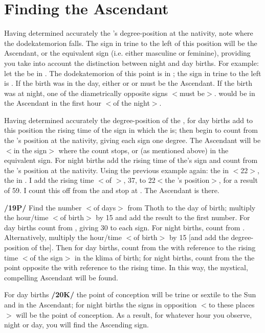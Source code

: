 \section{Finding the Ascendant}

Having determined accurately the \Sun’s degree-position at the nativity, note where the dodekatemorion falls. The sign in trine to the left of this position will be the Ascendant, or the equivalent sign (i.e. either masculine or feminine), providing you take into account the distinction between night and day births. For example: let the \Sun\xspace be in \Aquarius\xspace 22\deg. The dodekatemorion of this point is in \Scorpio; the sign in trine to the left is \Pisces. If the birth was in the day, either \Pisces\xspace or \Taurus\xspace or \Cancer\xspace must be the Ascendant. If the birth was at night, one of the diametrically opposite signs $<$must be$>$. \Virgo\xspace would be in the Ascendant in the first hour $<$of the night$>$.

Having determined accurately the degree-position of the \Sun, for day births add to this position the rising time of the sign in which the \Sun\xspace is; then begin to count from the \Moon’s position at the nativity, giving each sign one degree. The Ascendant will be $<$in the sign$>$ where the count stops, or (as mentioned above) in the equivalent sign. For night births add the rising time of the\Moon’s sign and count from the \Sun’s position at the nativity. Using the previous example again: the \Sun in \Aquarius\xspace $<$22\deg$>$, the \Moon\xspace in
\Scorpio. I add the rising time $<$of \Scorpio$>$, 37, to 22\deg $<$the \Sun’s position$>$, for a result of 59. I count this off from the \Sun\xspace and stop at \Virgo. The Ascendant is there.

\textbf{/19P/} Find the number $<$of days$>$ from Thoth to the day of birth; multiply the hour/time $<$of birth$>$ by 15 and add the result to the first number. For day births count from \Virgo, giving 30 to each sign. For night births, count from \Pisces.
Alternatively, multiply the hour/time $<$of birth$>$ by 15 [and add the degree-position of the\Sun]. Then for day births, count from the \Sun\xspace with reference to the rising time $<$of the sign$>$ in the klima of birth; for night births, count from the the point opposite the \Sun\xspace with reference to the rising time. In this way, the mystical, compelling Ascendant will be found. 

For day births \textbf{/20K/} the point of conception will be trine or sextile to the Sun and in the Ascendant; for night births the signs in opposition $<$to these places$>$ will be the point of conception. As a result, for whatever hour you observe, night or day, you will find the Ascending sign.

